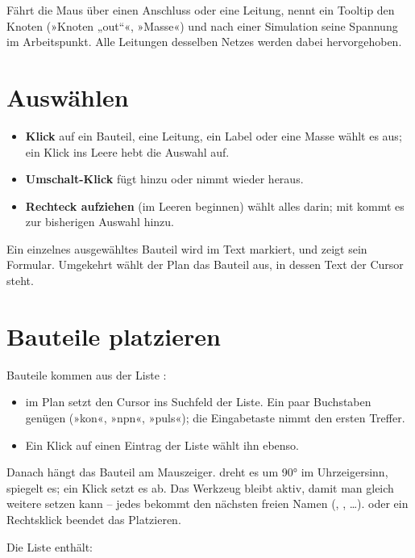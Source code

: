Fährt die Maus über einen Anschluss oder eine Leitung, nennt ein Tooltip
den Knoten (»Knoten „out“«, »Masse«) und nach einer Simulation seine
Spannung im Arbeitspunkt. Alle Leitungen desselben Netzes werden dabei
hervorgehoben.

\section{Auswählen}

\begin{itemize}
  \item \textbf{Klick} auf ein Bauteil, eine Leitung, ein Label oder eine
    Masse wählt es aus; ein Klick ins Leere hebt die Auswahl auf.
  \item \textbf{Umschalt-Klick} fügt hinzu oder nimmt wieder heraus.
  \item \textbf{Rechteck aufziehen} (im Leeren beginnen) wählt alles darin;
    mit  kommt es zur bisherigen Auswahl hinzu.
\end{itemize}

Ein einzelnes ausgewähltes Bauteil wird im Text markiert, und
 zeigt sein Formular. Umgekehrt wählt der Plan das
Bauteil aus, in dessen Text der Cursor steht.

\section{Bauteile platzieren}

Bauteile kommen aus der Liste :
\begin{itemize}
  \item {} im Plan setzt den Cursor ins Suchfeld der Liste. Ein paar
    Buchstaben genügen (»kon«, »npn«, »puls«); die Eingabetaste nimmt den
    ersten Treffer.
  \item Ein Klick auf einen Eintrag der Liste wählt ihn ebenso.
\end{itemize}

Danach hängt das Bauteil am Mauszeiger.  dreht es um 90° im
Uhrzeigersinn,  spiegelt es; ein Klick setzt es ab. Das Werkzeug
bleibt aktiv, damit man gleich weitere setzen kann – jedes bekommt den
nächsten freien Namen (, , \dots).  oder ein
Rechtsklick beendet das Platzieren.

Die Liste enthält:

